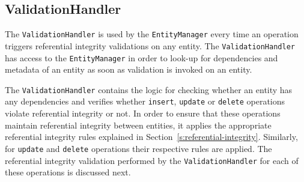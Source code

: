 		
		\subsection{ValidationHandler}\label{ss:VH}
		The \texttt{ValidationHandler} is used by the \texttt{EntityManager} every time
		an operation triggers  referential integrity validations on any entity.
		The \texttt{ValidationHandler} has access to the \texttt{EntityManager} in order
		to look-up for dependencies and metadata of an entity as soon as  validation is
		invoked on an entity.
		
		The \texttt{ValidationHandler} contains the  logic for checking whether an
		entity has any dependencies and verifies whether  \texttt{insert},
		\texttt{update} or \texttt{delete} operations  violate  referential integrity or
		not.   In order to ensure that these operations maintain referential integrity
		between entities,  it applies the appropriate referential integrity rules
		explained in Section~\ref{s:referential-integrity}. Similarly,  for
		\texttt{update} and \texttt{delete} operations their respective rules are
		applied.   The referential integrity validation performed by the
		\texttt{ValidationHandler} for each of these operations is discussed next.
		
